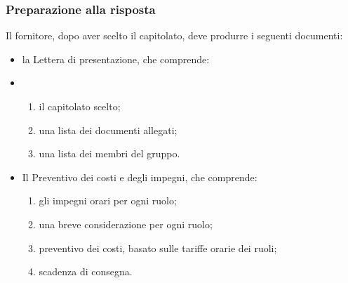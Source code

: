     \subsubsection{Preparazione alla risposta}\label{sec:preparazione}
        Il fornitore, dopo aver scelto il capitolato, deve produrre i seguenti documenti:
        \begin{itemize}
            \item la Lettera di presentazione, che comprende: 
            \item \begin{enumerate}
                \item il capitolato scelto;
                \item una lista dei documenti allegati;
                \item una lista dei membri del gruppo.
            \end{enumerate}
            \item Il Preventivo dei costi e degli impegni, che comprende:  
            \begin{enumerate}
                \item gli impegni orari per ogni ruolo;
                \item una breve considerazione per ogni ruolo;
                \item preventivo dei costi, basato sulle tariffe orarie dei ruoli;
                \item scadenza di consegna. 
            \end{enumerate}
        \end{itemize}

